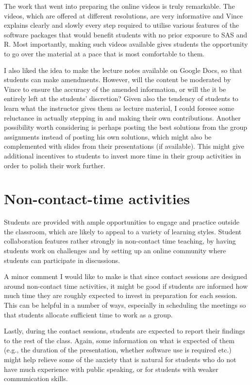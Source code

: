 \documentclass[12pt,a4paper]{article}
\begin{document}
The work that went into preparing the online videos is truly remarkable. The videos, which are offered at different resolutions, are very informative and Vince explains clearly and slowly every step required to utilise various features of the software packages that would benefit students with no prior exposure to SAS and R. Most importantly, making such videos available gives students the opportunity to go over the material at a pace that is most comfortable to them.

I also liked the idea to make the lecture notes available on Google Docs, so that students can make amendments. However, will the content be  moderated by Vince to ensure the accuracy of the amended information, or will the it be entirely left at the students' discretion? Given also the tendency of students to learn what the instructor gives them as lecture material, I could foresee some reluctance in actually stepping in and making their own contributions. Another possibility worth considering is perhaps posting the best solutions from the group assignments instead of posting his own solutions, which might also be complemented with slides from their presentations (if available). This might give additional incentives to students to invest more time in their group activities in order to polish their work further.

\section{Non-contact-time activities}

Students are provided with ample opportunities to engage and practice outside the classroom, which are likely to appeal to a variety of learning styles. Student collaboration features rather strongly in non-contact time teaching, by having students work on challenges and by setting up an online community where students can participate in discussions.

A minor comment I would like to make is that since contact sessions are designed around non-contact time activities, it might be good if students are informed how much time they are roughly expected to invest in preparation for each session. This can be helpful in a number of ways, especially in scheduling the meetings so that students allocate sufficient time to work as a group.

Lastly, during the contact sessions, students are expected to report their findings to the rest of the class. Again, some information on what is expected of them (e.g., the duration of the presentation, whether software use is required etc.) might help relieve some of the anxiety that is natural for students who do not have much experience with public speaking, or for students with weaker communication skills.
\end{document}
